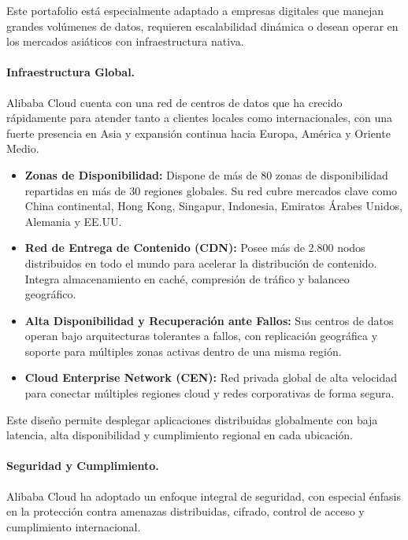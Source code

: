 {                Este portafolio está especialmente adaptado a empresas digitales que manejan grandes volúmenes de datos, requieren escalabilidad dinámica o desean operar en los mercados asiáticos con infraestructura nativa.
                
                \paragraph{Infraestructura Global.}
                Alibaba Cloud cuenta con una red de centros de datos que ha crecido rápidamente para atender tanto a clientes locales como internacionales, con una fuerte presencia en Asia y expansión continua hacia Europa, América y Oriente Medio.
                
                \begin{itemize}
                    \item \textbf{Zonas de Disponibilidad:} Dispone de más de 80 zonas de disponibilidad repartidas en más de 30 regiones globales. Su red cubre mercados clave como China continental, Hong Kong, Singapur, Indonesia, Emiratos Árabes Unidos, Alemania y EE.UU.
                    \item \textbf{Red de Entrega de Contenido (CDN):} Posee más de 2.800 nodos distribuidos en todo el mundo para acelerar la distribución de contenido. Integra almacenamiento en caché, compresión de tráfico y balanceo geográfico.
                    \item \textbf{Alta Disponibilidad y Recuperación ante Fallos:} Sus centros de datos operan bajo arquitecturas tolerantes a fallos, con replicación geográfica y soporte para múltiples zonas activas dentro de una misma región.
                    \item \textbf{Cloud Enterprise Network (CEN):} Red privada global de alta velocidad para conectar múltiples regiones cloud y redes corporativas de forma segura.
                \end{itemize}
                
                Este diseño permite desplegar aplicaciones distribuidas globalmente con baja latencia, alta disponibilidad y cumplimiento regional en cada ubicación.
                
                \paragraph{Seguridad y Cumplimiento.}
                Alibaba Cloud ha adoptado un enfoque integral de seguridad, con especial énfasis en la protección contra amenazas distribuidas, cifrado, control de acceso y cumplimiento internacional.
                
}
